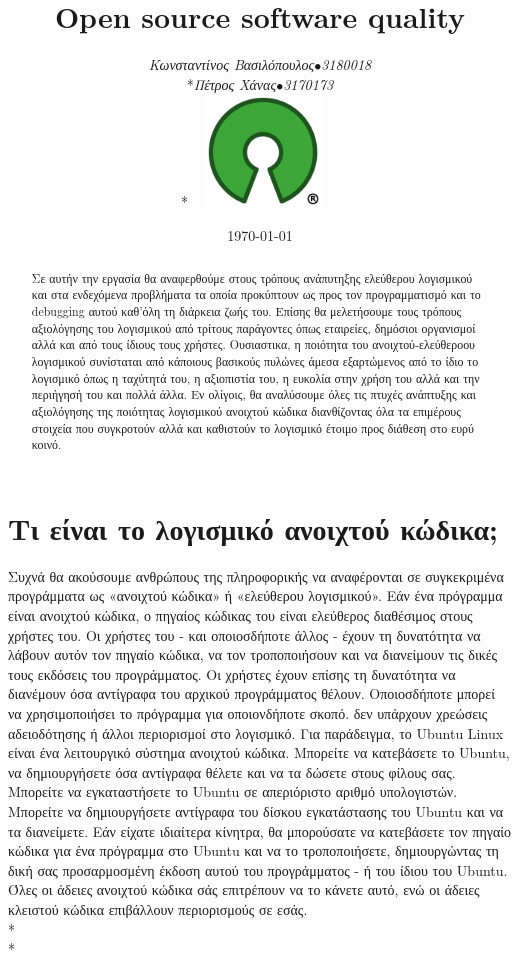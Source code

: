 \documentclass[a4paper, 11pt]{article}
\title{\textbf{\textlatin{ Open source software quality}}}
\author{{\textit{Κωνσταντίνος Βασιλόπουλος\(\bullet\)3180018}\\*\textit{Πέτρος Χάνας\(\bullet\)3170173}}\\*\includegraphics[width=4cm, height=3cm]{oSource}}
\date{\today}
\begin{document}

\maketitle

{\selectfont
\begin{abstract}
Σε αυτήν την εργασία θα αναφερθούμε στους τρόπους ανάπυτηξης ελεύθερου λογισμικού
και στα ενδεχόμενα προβλήματα τα οποία προκύπτουν ως προς τον προγραμματισμό και το 
\textlatin{debugging} αυτού καθ'όλη τη διάρκεια ζωής του. Επίσης θα μελετήσουμε τους 
τρόπους αξιολόγησης του λογισμικού από τρίτους παράγοντες όπως εταιρείες, δημόσιοι οργανισμοί 
αλλά και από τους ίδιους τους χρήστες. Ουσιαστικα, η ποιότητα του ανοιχτού-ελεύθεροου λογισμικού 
συνίσταται από κάποιους βασικούς πυλώνες άμεσα εξαρτώμενος από το ίδιο το λογισμικό όπως η ταχύτητά
του, η αξιοπιστία του, η ευκολία στην χρήση του αλλά και την περιήγησή του και πολλά άλλα. Εν ολίγοις, 
θα αναλύσουμε όλες τις πτυχές ανάπτυξης και αξιολόγησης της ποιότητας λογισμικού ανοιχτού κώδικα 
διανθίζοντας όλα τα επιμέρους στοιχεία που συγκροτούν αλλά και καθιστούν το λογισμικό έτοιμο προς διάθεση 
στο ευρύ κοινό.
\end{abstract}

{\selectfont\section{Τι είναι το λογισμικό ανοιχτού κώδικα\textlatin{;}}}
 Συχνά θα ακούσουμε ανθρώπους της πληροφορικής να αναφέρονται σε συγκεκριμένα προγράμματα ως «ανοιχτού κώδικα» ή «ελεύθερου λογισμικού». Εάν ένα πρόγραμμα είναι ανοιχτού κώδικα, ο πηγαίος κώδικας του είναι ελεύθερος διαθέσιμος στους χρήστες του. Οι χρήστες του - και οποιοσδήποτε άλλος - έχουν τη δυνατότητα να λάβουν αυτόν τον πηγαίο κώδικα, να τον τροποποιήσουν και να διανείμουν τις δικές τους εκδόσεις του προγράμματος. Οι χρήστες έχουν επίσης τη δυνατότητα να διανέμουν όσα αντίγραφα του αρχικού προγράμματος θέλουν. Οποιοσδήποτε μπορεί να χρησιμοποιήσει το πρόγραμμα για οποιονδήποτε σκοπό. δεν υπάρχουν χρεώσεις αδειοδότησης ή άλλοι περιορισμοί στο λογισμικό. Για παράδειγμα, το \textlatin{Ubuntu Linux} είναι ένα λειτουργικό σύστημα ανοιχτού κώδικα. Μπορείτε να κατεβάσετε το \textlatin{Ubuntu}, να δημιουργήσετε όσα αντίγραφα θέλετε και να τα δώσετε στους φίλους σας. Μπορείτε να εγκαταστήσετε το Ubuntu σε απεριόριστο αριθμό υπολογιστών. Μπορείτε να δημιουργήσετε αντίγραφα του δίσκου εγκατάστασης του \textlatin{Ubuntu} και να τα διανείμετε. Εάν είχατε ιδιαίτερα κίνητρα, θα μπορούσατε να κατεβάσετε τον πηγαίο κώδικα για ένα πρόγραμμα στο Ubuntu και να το τροποποιήσετε, δημιουργώντας τη δική σας προσαρμοσμένη έκδοση αυτού του προγράμματος - ή του ίδιου του \textlatin{Ubuntu}. Όλες οι άδειες ανοιχτού κώδικα σάς επιτρέπουν να το κάνετε αυτό, ενώ οι άδειες κλειστού κώδικα επιβάλλουν περιορισμούς σε εσάς.\\*
\\*
}
\end{document}

